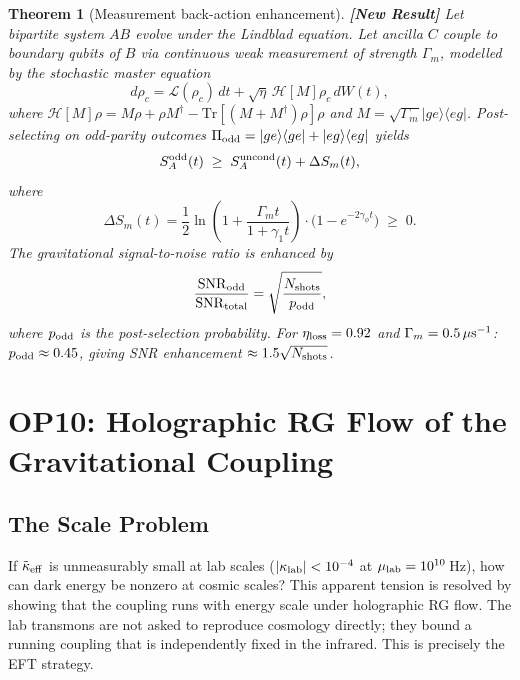 \documentclass[12pt,letterpaper]{article}
\newtheorem{theorem}{Theorem}[section]
\theoremstyle{definition}
\theoremstyle{remark}
\newcommand{\newresult}{\textbf{[New Result]}}
\newcommand{\keff}{\tilde{\kappa}_{\rm eff}}
\newcommand{\gammaone}{\gamma_{1}}
\newcommand{\gammaphi}{\gamma_{\phi}}
\begin{document}
\begin{theorem}[Measurement back-action enhancement] \label{thm:measurement}
\newresult{}
Let bipartite system $AB$ evolve under the Lindblad equation.
Let ancilla $C$ couple to boundary qubits of $B$ via continuous weak measurement of
strength $\Gamma_m$, modelled by the stochastic master equation
\begin{equation}
d\rho_c = \mathcal{L}(\rho_c)\,dt
  + \sqrt{\eta}\,\mathcal{H}[M]\rho_c\,dW(t),
\end{equation}
where $\mathcal{H}[M]\rho = M\rho + \rho M^\dagger
- \mathrm{Tr}[(M+M^\dagger)\rho]\rho$
and $M = \sqrt{\Gamma_m}|ge\rangle\langle eg|$.
Post-selecting on odd-parity outcomes $\Pi_{\rm odd} = |ge\rangle\langle ge|
+ |eg\rangle\langle eg|$ yields
\begin{equation}
S_A^{\rm odd}(t) \;\ge\; S_A^{\rm uncond}(t) + \Delta S_m(t),
\end{equation}
where
\begin{equation}
\Delta S_m(t) = \frac{1}{2}\ln\!\left(
  1 + \frac{\Gamma_m t}{1+\gammaone t}\right)
  \cdot\bigl(1 - e^{-2\gammaphi t}\bigr) \;\ge\; 0.
\end{equation}
The gravitational signal-to-noise ratio is enhanced by
\begin{equation}
\frac{{\rm SNR}_{\rm odd}}{{\rm SNR}_{\rm total}}
  = \sqrt{\frac{N_{\rm shots}}{p_{\rm odd}}},
\end{equation}
where $p_{\rm odd}$ is the post-selection probability.
For $\eta_{\rm loss} = 0.92$ and $\Gamma_m = 0.5\,\mu{\rm s}^{-1}$:
$p_{\rm odd}\approx 0.45$, giving SNR enhancement $\approx 1.5\sqrt{N_{\rm shots}}$.
\end{theorem}

\section{OP10: Holographic RG Flow of the Gravitational Coupling}
\label{sec:rg}

\subsection{The Scale Problem}

If $\keff$ is unmeasurably small at lab scales
($|\kappa_{\rm lab}| < 10^{-4}$ at $\mu_{\rm lab} = 10^{10}\,$Hz), how can dark energy
be nonzero at cosmic scales?
This apparent tension is resolved by showing that the coupling runs with energy scale
under holographic RG flow.
The lab transmons are not asked to reproduce cosmology directly; they bound a running
coupling that is independently fixed in the infrared.
This is precisely the EFT strategy.
\end{document}
